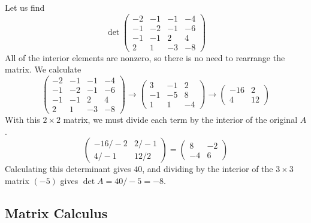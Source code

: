 \documentclass{article}
\begin{document}
    \begin{example}
    Let us find
    \[\det{\begin{pmatrix}
    -2&-1&-1&-4\\-1&-2&-1&-6\\-1&-1&2&4\\2&1&-3&-8
    \end{pmatrix}}\]
    All of the interior elements are nonzero, so there is no need to rearrange the matrix. We calculate
    \[\begin{pmatrix}
    -2&-1&-1&-4\\-1&-2&-1&-6\\-1&-1&2&4\\2&1&-3&-8
    \end{pmatrix} \rightarrow \begin{pmatrix}
    3&-1&2\\-1&-5&8\\1&1&-4
    \end{pmatrix} \rightarrow \begin{pmatrix}
    -16&2\\4&12
    \end{pmatrix}\]
    With this $2 \times 2$ matrix, we must divide each term by the interior of the original $A$. 
    \[\begin{pmatrix}
    -16/-2 & 2/-1\\4/-1 & 12/2
    \end{pmatrix} = \begin{pmatrix}
    8&-2\\-4&6
    \end{pmatrix}\]
    Calculating this determinant gives $40$, and dividing by the interior of the $3 \times 3$ matrix $(-5)$ gives $\det{A} = 40/-5 = -8$. 
    \end{example}

  \subsection{Matrix Calculus}
\end{document}
